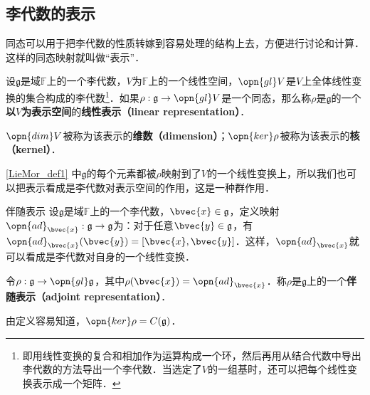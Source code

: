 \subsection{李代数的表示}

同态可以用于把李代数的性质转嫁到容易处理的结构上去，方便进行讨论和计算．这样的同态映射就叫做“表示”．

\begin{definition}{}\label{LieMor_def1}
设$\mathfrak{g}$是域$\mathbb{F}$上的一个李代数，$V$为$\mathbb{F}$上的一个线性空间，$\opn{gl}V$是$V$上全体线性变换的集合构成的李代数\footnote{即用线性变换的复合和相加作为运算构成一个环，然后再用从结合代数中导出李代数的方法导出一个李代数．当选定了$V$的一组基时，还可以把每个线性变换表示成一个矩阵．}．如果$\rho:\mathfrak{g}\to \opn{gl}V$是一个同态，那么称$\rho$是$\mathfrak{g}$的一个\textbf{以}$V$\textbf{为表示空间}的\textbf{线性表示（linear representation）}．

$\opn{dim} V$被称为该表示的\textbf{维数（dimension）}；$\opn{ker}\rho$被称为该表示的\textbf{核（kernel）}．
\end{definition}

\autoref{LieMor_def1} 中$\mathfrak{g}$的每个元素都被$\rho$映射到了$V$的一个线性变换上，所以我们也可以把表示看成是李代数对表示空间的作用，这是一种群作用．



\begin{example}{伴随表示}
设$\mathfrak{g}$是域$\mathbb{F}$上的一个李代数，$\bvec{x}\in\mathfrak{g}$，定义映射$\opn{ad}_\bvec{x} :\mathfrak{g}\to\mathfrak{g}$为：对于任意$\bvec{y}\in\mathfrak{g}$，有$\opn{ad}_\bvec{x}(\bvec{y})=[\bvec{x}, \bvec{y}]$．这样，$\opn{ad}_\bvec{x}$就可以看成是李代数对自身的一个线性变换．

令$\rho:\mathfrak{g}\to\opn{gl}\mathfrak{g}$，其中$\rho(\bvec{x})=\opn{ad}_\bvec{x}$．称$\rho$是$\mathfrak{g}$上的一个\textbf{伴随表示（adjoint representation）}．

由定义容易知道，$\opn{ker}\rho=C(\mathfrak{g})$．
\end{example}










